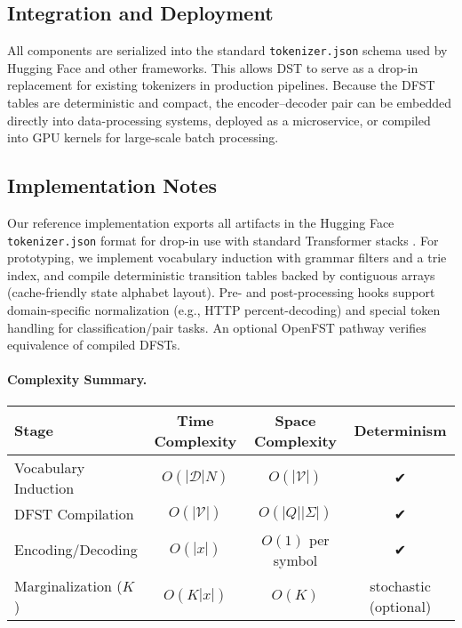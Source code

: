 \subsection{Integration and Deployment}

All components are serialized into the standard \texttt{tokenizer.json} schema used by Hugging Face and other frameworks.
This allows DST to serve as a drop-in replacement for existing tokenizers in production pipelines.
Because the DFST tables are deterministic and compact, the encoder–decoder pair can be embedded directly into data-processing systems, deployed as a microservice, or compiled into GPU kernels for large-scale batch processing.

\subsection{Implementation Notes}

Our reference implementation exports all artifacts in the Hugging Face \texttt{tokenizer.json} format for drop-in use with standard Transformer stacks \citep{HuggingFace2023Transformers}.
For prototyping, we implement vocabulary induction with grammar filters and a trie index, and compile deterministic transition tables backed by contiguous arrays (cache-friendly state\,\times\,alphabet layout).
Pre- and post-processing hooks support domain-specific normalization (e.g., HTTP percent-decoding) and special token handling for classification/pair tasks.
An optional OpenFST pathway \citep{OpenFST2009, Riley2009OpenFST} verifies equivalence of compiled DFSTs.

\paragraph{Complexity Summary.}
\begin{center}
\begin{tabular}{lccc}
\toprule
Stage & Time Complexity & Space Complexity & Determinism \\
\midrule
Vocabulary Induction & $O(|\mathcal{D}|N)$ & $O(|\mathcal{V}|)$ & ✔ \\
DFST Compilation & $O(|\mathcal{V}|)$ & $O(|Q||\Sigma|)$ & ✔ \\
Encoding/Decoding & $O(|x|)$ & $O(1)$ per symbol & ✔ \\
Marginalization ($K$) & $O(K|x|)$ & $O(K)$ & stochastic (optional) \\
\bottomrule
\end{tabular}
\end{center}

